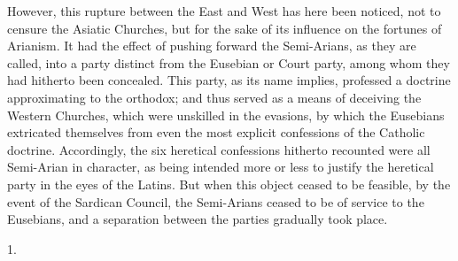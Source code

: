 However, this rupture between the East and West has here been
noticed, not to censure the Asiatic Churches, but for the sake of its
influence on the fortunes of Arianism. It had the effect of pushing
forward the Semi-Arians, as they are called, into a party distinct
from the Eusebian or Court party, among whom they had hitherto been
concealed. This party, as its name implies, professed a doctrine
approximating to the orthodox; and thus served as a means of deceiving
the Western Churches, which were unskilled in the evasions, by which
the Eusebians extricated themselves from even the most explicit
confessions of the Catholic doctrine. Accordingly, the six heretical
confessions hitherto recounted were all Semi-Arian in character, as
being intended more or less to justify the heretical party in the eyes
of the Latins. But when this object ceased to be feasible, by
the event of the Sardican Council, the Semi-Arians ceased to be of
service to the Eusebians, and a separation between the parties
gradually took place.

1.

